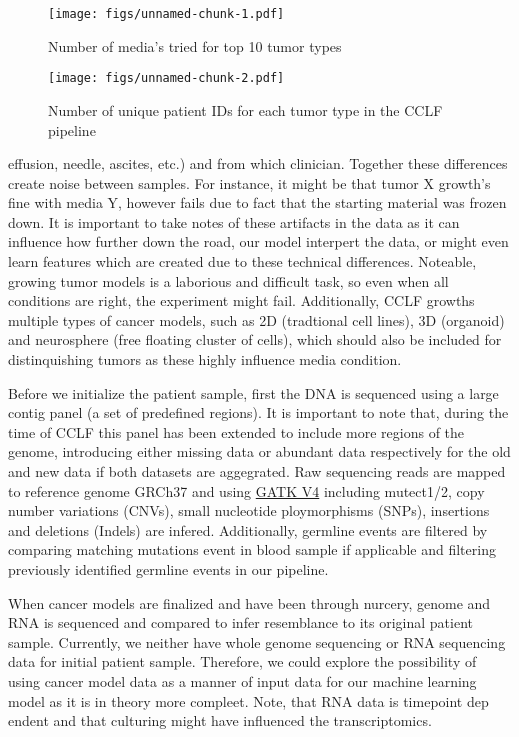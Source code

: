 \documentclass[11pt,]{article}
\begin{document}
\newpage
\begin{landscape}

\begin{figure}
\centering
\texttt{[image: figs/unnamed-chunk-1.pdf]}
\caption{Number of media's tried for top 10 tumor types}
\end{figure}

\end{landscape}
\newpage

\begin{figure}
\centering
\texttt{[image: figs/unnamed-chunk-2.pdf]}
\caption{Number of unique patient IDs for each tumor type in the CCLF
pipeline}
\end{figure}

\noindent effusion, needle, ascites, etc.) and from which clinician.
Together these differences create noise between samples. For instance,
it might be that tumor X growth's fine with media Y, however fails due
to fact that the starting material was frozen down. It is important to
take notes of these artifacts in the data as it can influence how
further down the road, our model interpert the data, or might even learn
features which are created due to these technical differences. Noteable,
growing tumor models is a laborious and difficult task, so even when all
conditions are right, the experiment might fail. Additionally, CCLF
growths multiple types of cancer models, such as 2D (tradtional cell
lines), 3D (organoid) and neurosphere (free floating cluster of cells),
which should also be included for distinquishing tumors as these highly
influence media condition.

Before we initialize the patient sample, first the DNA is sequenced
using a large contig panel (a set of predefined regions). It is
important to note that, during the time of CCLF this panel has been
extended to include more regions of the genome, introducing either
missing data or abundant data respectively for the old and new data if
both datasets are aggegrated. Raw sequencing reads are mapped to
reference genome GRCh37 and using
\href{https://gatk.broadinstitute.org/hc/en-us}{GATK V4} including
mutect1/2, copy number variations (CNVs), small nucleotide ploymorphisms
(SNPs), insertions and deletions (Indels) are infered. Additionally,
germline events are filtered by comparing matching mutations event in
blood sample if applicable and filtering previously identified germline
events in our pipeline.

When cancer models are finalized and have been through nurcery, genome
and RNA is sequenced and compared to infer resemblance to its original
patient sample. Currently, we neither have whole genome sequencing or
RNA sequencing data for initial patient sample. Therefore, we could
explore the possibility of using cancer model data as a manner of input
data for our machine learning model as it is in theory more compleet.
Note, that RNA data is timepoint dep endent and that culturing might
have influenced the transcriptomics.
\end{document}
